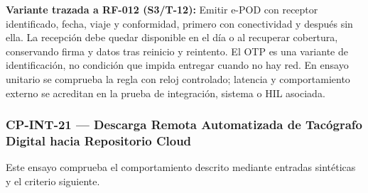 \par\noindent\textbf{Variante trazada a RF-012 (S3/T-12):} Emitir e-POD con receptor identificado, fecha, viaje y conformidad, primero con conectividad y después sin ella. La recepción debe quedar disponible en el día o al recuperar cobertura, conservando firma y datos tras reinicio y reintento. El OTP es una variante de identificación, no condición que impida entregar cuando no hay red. En ensayo unitario se comprueba la regla con reloj controlado; latencia y comportamiento externo se acreditan en la prueba de integración, sistema o HIL asociada.\par
\subsubsection*{CP-INT-21 — Descarga Remota Automatizada de Tacógrafo Digital hacia Repositorio Cloud}\label{sec:9-cp-int-21}
Este ensayo comprueba el comportamiento descrito mediante entradas sintéticas y el criterio siguiente.

